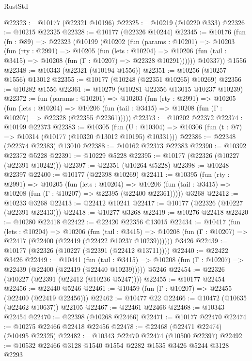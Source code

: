 \begin{lexlean}{RustStd}
\begin{coremodule}
@22323 := @10177 (@22321 @10196)
@22325 := @10219 (@10220 @333)
@22326 := @10215 @22325
@22328 := @10177 (@22326 @10244)
@22345 := @10176
    (fun (fn : @89) =>
    @22323
      (@10199
        (@10202
          (fun (params : @10201) =>
          @10203
            (fun (rty : @2991) =>
            @10205
              (fun (lets : @10204) =>
              @10206 (fun (tail : @3415) => @10208 (fun (Γ : @10207) => @22328 @10291))))))
        @10337))
    @1556
@22348 := @10343 (@22321 (@10194 @1556))
@22351 := @10256 (@10257 @1556) @13012
@22355 := @10177 (@10248 (@22351 @10265) @10269)
@22356 := @10282 @1556
@22361 := @10279 (@10281 @22356 @13015 @10237 @10239)
@22372 := fun (params : @10201) =>
  @10203
    (fun (rty : @2991) =>
    @10205
      (fun (lets : @10204) =>
      @10206 (fun (tail : @3415) => @10208 (fun (Γ : @10207) => @22328 (@22355 @22361)))))
@22373 := @10202 @22372
@22374 := @10199 @22373
@22383 := @10305
    (fun (U : @10304) => @10306 (fun (t : @7) => @10314 (@10177 (@10320 @13012 @10195) @10331)))
@22386 := @22348 (@22374 @22383) @13010
@22388 := @10162 @22373 @22383
@22390 := @10392 @22372 @5228
@22391 := @10229 @5228
@22395 := @10177 (@22326 (@10227 (@22391 @10242)))
@22397 := @22351 (@10264 @5228)
@22398 := @10248 @22397
@22400 := @10177 (@22398 @10269)
@22411 := @10395
    (fun (rty : @2991) =>
    @10205
      (fun (lets : @10204) =>
      @10206 (fun (tail : @3415) => @10208 (fun (Γ : @10207) => @22395 (@22400 @22361)))))
    @3268
@22412 := @10233 @3268
@22413 := @22412 @10241
@22417 := @10177 (@22326 (@10227 (@22391 @22413)))
@22418 := @10277 @3268
@22419 := @10276 @22418
@22420 := @10280 @22418
@22422 := @22420 @22356 @13015
@22434 := @10417
    (fun (lets : @10204) =>
    @10206
      (fun (tail : @3415) =>
      @10208 (fun (Γ : @10207) => @22417 (@22400 (@22419 (@22422 @10237 @10239))))))
    @3426
@22439 := @10177 (@22326 (@10227 (@22391 (@22412 @13711))))
@22440 := @22422 @3426
@22449 := @10441
    (fun (tail : @3415) => @10208 (fun (Γ : @10207) => @22439 (@22400 (@22419 (@22440 @10239)))))
    @5246
@22454 := @22326 (@10227 (@22391 (@22412 (@10236 @5247))))
@22455 := @10177 @22454
@22456 := @22440 @5246
@22461 := @10459 (fun (Γ : @10207) => @22455 (@22400 (@22419 @22456)))
@22462 := @10477 @22
@22466 := @10472 (@10635 (@22462 @10637)) @22105
@22467 := @22461 @22466
@22468 := @10343 @22454
@22470 := @22398 (@10268 @22466)
@22471 := @10177 @22470
@22474 := @10275 @22466 @22418 @22456
@22478 := @22468 (@22471 @22474) (@10495 @22325)
@22482 := @10343 @22470 @22474 (@10500 @22397)
@22492 := @10532 @22466 @3128 @1540 @1554 @2282 @1535 @3426 @5244 @3128 @2293

\end{coremodule}
\end{lexlean}
